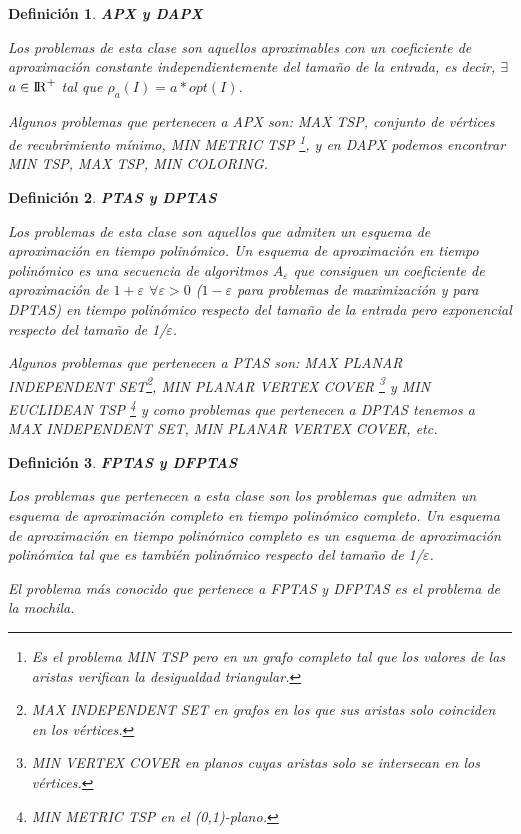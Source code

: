 \documentclass[a4paper,12pt,titlepage]{article}
\newtheorem{defi}{Definici\'on}[section]
\begin{document}
\begin{defi}

\textbf{APX y DAPX}

Los problemas de esta clase son aquellos aproximables con un coeficiente de aproximaci\'on constante independientemente del tamaño de la entrada, es decir, $\exists$$a\in{{\rm I\!R}^{+}}$ tal que $\rho_{a}(I)=a*opt(I)$.

Algunos problemas que pertenecen a APX son: MAX TSP, conjunto de v\'ertices de recubrimiento m\'inimo, MIN METRIC TSP \footnote{Es el problema MIN TSP pero en un grafo completo tal que los valores de las aristas verifican la desigualdad triangular.}, y en DAPX podemos encontrar MIN TSP, MAX TSP, MIN COLORING.

\end{defi}

\begin{defi}

\textbf{PTAS y DPTAS}

Los problemas de esta clase son aquellos que admiten un esquema de aproximaci\'on en tiempo polin\'omico. Un esquema de aproximaci\'on en tiempo polin\'omico es una secuencia de algoritmos $A_{\varepsilon}$ que consiguen un coeficiente de aproximaci\'on de $1+\varepsilon$ $\forall\varepsilon> 0$ ($1-\varepsilon$ para problemas de maximizaci\'on y para DPTAS) en tiempo polin\'omico respecto del tamaño de la entrada pero exponencial respecto del tamaño de 1/$\varepsilon$.

Algunos problemas que pertenecen a PTAS son: MAX PLANAR INDEPENDENT SET\footnote{MAX INDEPENDENT SET en grafos en los que sus aristas solo coinciden en los v\'ertices.}, MIN PLANAR VERTEX COVER \footnote{MIN VERTEX COVER en planos cuyas aristas solo se intersecan en los v\'ertices.} y MIN EUCLIDEAN TSP \footnote{MIN METRIC TSP en el (0,1)-plano.} y como problemas que pertenecen a DPTAS tenemos a MAX INDEPENDENT SET, MIN PLANAR VERTEX COVER, etc.

\end{defi}

\begin{defi}

\textbf{FPTAS y DFPTAS}

Los problemas que pertenecen a esta clase son los problemas que admiten un esquema de aproximaci\'on completo en tiempo polin\'omico completo. Un esquema de aproximaci\'on en tiempo polin\'omico completo es un esquema de aproximaci\'on polin\'omica tal que es tambi\'en polin\'omico respecto del tamaño de 1/$\varepsilon$.

El problema m\'as conocido que pertenece a FPTAS y DFPTAS es el problema de la mochila.

\end{defi}
\end{document}
